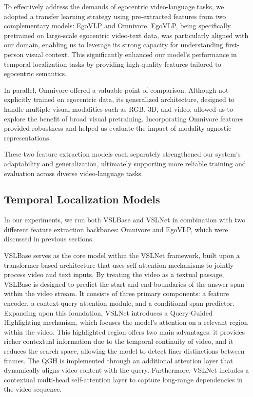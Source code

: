 \documentclass[10pt,twocolumn,letterpaper]{article}
\begin{document}
	
To effectively address the demands of egocentric video-language tasks, we adopted a transfer learning strategy using pre-extracted features from two complementary models: EgoVLP and Omnivore. EgoVLP, being specifically pretrained on large-scale egocentric video-text data, was particularly aligned with our domain, enabling us to leverage its strong capacity for understanding first-person visual context. This significantly enhanced our model's performance in temporal localization tasks by providing high-quality features tailored to egocentric semantics\cite{6_Egocentric_Video_Language_Pretraining}.
	
In parallel, Omnivore offered a valuable point of comparison. Although not explicitly trained on egocentric data, its generalized architecture, designed to handle multiple visual modalities such as RGB, 3D, and video, allowed us to explore the benefit of broad visual pretraining. Incorporating Omnivore features provided robustness and helped us evaluate the impact of modality-agnostic representations\cite{8_OMNIVORE_ASingle_Model_for_Many_Visual_Modalities}.
	
These two feature extraction models each separately strengthened our system's adaptability and generalization, ultimately supporting more reliable training and evaluation across diverse video-language tasks.
	
	
\subsection{Temporal Localization Models}
\label{sec:temporal}
	
In our experiments, we run both VSLBase and VSLNet in combination with two different feature extraction backbones: Omnivore and EgoVLP, which were discussed in previous sections.
	
VSLBase serves as the core model within the VSLNet framework, built upon a transformer-based architecture that uses self-attention mechanisms to jointly process video and text inputs. By treating the video as a textual passage, VSLBase is designed to predict the start and end boundaries of the answer span within the video stream. It consists of three primary components: a feature encoder, a context-query attention module, and a conditional span predictor. Expanding upon this foundation, VSLNet introduces a Query-Guided Highlighting mechanism, which focuses the model's attention on a relevant region within the video. This highlighted region offers two main advantages: it provides richer contextual information due to the temporal continuity of video, and it reduces the search space, allowing the model to detect finer distinctions between frames. The QGH is implemented through an additional attention layer that dynamically aligns video content with the query. Furthermore, VSLNet includes a contextual multi-head self-attention layer to capture long-range dependencies in the video sequence\cite{4_Span_based_Localizing_Network_for_Natural_Language_Video_Localization}.
	
\end{document}
